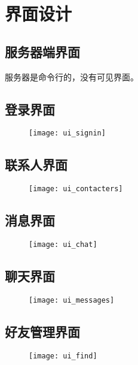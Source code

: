 \chapter{界面设计}
\section{服务器端界面}
服务器是命令行的，没有可见界面。

\section{登录界面}
\begin{figure}[h]
	\centering
	\texttt{[image: ui\_signin]}
\end{figure}

\section{联系人界面}
\begin{figure}[h]
	\centering
	\texttt{[image: ui\_contacters]}
\end{figure}
\section{消息界面}
\begin{figure}[h]
	\centering
	\texttt{[image: ui\_chat]}
\end{figure}
\section{聊天界面}
\begin{figure}[h]
	\centering
	\texttt{[image: ui\_messages]}
\end{figure}
\section{好友管理界面}
\begin{figure}[h]
	\centering
	\texttt{[image: ui\_find]}
\end{figure}